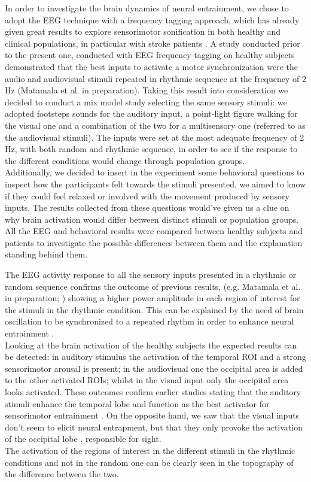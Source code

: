 In order to investigate the brain dynamics of neural entrainment, we chose to adopt the EEG technique with a frequency tagging approach, which has already given great results to explore sensorimotor sonification in both healthy \parencite{Cracco_2022} and clinical populations, in particular with stroke patients \parencite{Nozaradan_2017}. A study conducted prior to the present one, conducted with EEG frequency-tagging on healthy subjects demonstrated that the best inputs to activate a motor synchronization were the audio and audiovisual stimuli repeated in rhythmic sequence at the frequency of 2 Hz (Matamala et al. in preparation). Taking this result into consideration we decided to conduct a mix model study selecting the same sensory stimuli: we adopted footsteps sounds for the auditory input, a point-light figure walking for the visual one and a combination of the two for a multisensory one (referred to as the audiovisual stimuli). The inputs were set at the most adequate frequency of 2 Hz, with both random and rhythmic sequence, in order to see if the response to the different conditions would change through population groups. \\
Additionally, we decided to insert in the experiment some behavioral questions to inspect how the participants felt towards the stimuli presented, we aimed to know if they could feel relaxed or involved with the movement produced by sensory inputs. The results collected from these questions would've given us a clue on why brain activation would differ between distinct stimuli or population groups. \\
All the EEG and behavioral results were compared between healthy subjects and patients to investigate the possible differences between them and the explanation standing behind them. 

The EEG activity response to all the sensory inputs presented in a rhythmic or random sequence confirms the outcome of previous results, (e.g. Matamala et al. in preparation; \parencite{Haegens_2018}) showing a higher power amplitude in each region of interest for the stimuli in the rhythmic condition. This can be explained by the need of brain oscillation to be synchronized to a repeated rhythm in order to enhance neural entrainment \parencite{Rosso_2023}. \\
Looking at the brain activation of the healthy subjects the expected results can be detected: in auditory stimulus the activation of the temporal ROI and a strong sensorimotor arousal is present; in the audiovisual one the occipital area is added to the other activated ROIs; whilst in the visual input only the occipital area looks activated. These outcomes confirm earlier studies stating that the auditory stimuli enhance the temporal lobe and function as the best activator for sensorimotor entrainment \parencite{Thaut_1999}. On the opposite hand, we saw that the visual inputs don't seem to elicit neural entrapment, but that they only provoke the activation of the occipital lobe \parencite{Nehmad_1998}, responsible for sight. \\
The activation of the regions of interest in the different stimuli in the rhythmic conditions and not in the random one can be clearly seen in the topography of the difference between the two. 

